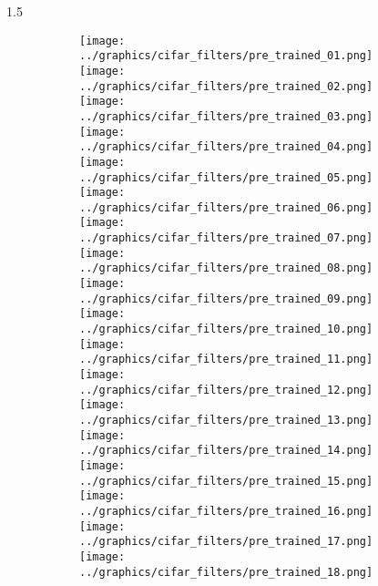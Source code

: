 \documentclass[final]{beamer}
\newlength{\onecolwid}
\newlength{\threecolwid}
\begin{document}
\begin{frame}[t]
\begin{columns}[t]
\begin{column}{\threecolwid}
\begin{alertblock}
\begin{columns}[t]
\begin{column}{1.5\onecolwid}
\begin{figure}
				\begin{subfigure}{.4\linewidth}
					\centering
					\texttt{[image: ../graphics/cifar\_filters/pre\_trained\_01.png]} 
					\texttt{[image: ../graphics/cifar\_filters/pre\_trained\_02.png]} %
					\texttt{[image: ../graphics/cifar\_filters/pre\_trained\_03.png]}
					\texttt{[image: ../graphics/cifar\_filters/pre\_trained\_04.png]} %
					\texttt{[image: ../graphics/cifar\_filters/pre\_trained\_05.png]} %
					\texttt{[image: ../graphics/cifar\_filters/pre\_trained\_06.png]} \\
					\texttt{[image: ../graphics/cifar\_filters/pre\_trained\_07.png]} %
					\texttt{[image: ../graphics/cifar\_filters/pre\_trained\_08.png]} %
					\texttt{[image: ../graphics/cifar\_filters/pre\_trained\_09.png]}
					\texttt{[image: ../graphics/cifar\_filters/pre\_trained\_10.png]} 
					\texttt{[image: ../graphics/cifar\_filters/pre\_trained\_11.png]} %
					\texttt{[image: ../graphics/cifar\_filters/pre\_trained\_12.png]} \\
					\texttt{[image: ../graphics/cifar\_filters/pre\_trained\_13.png]} %
					\texttt{[image: ../graphics/cifar\_filters/pre\_trained\_14.png]} %
					\texttt{[image: ../graphics/cifar\_filters/pre\_trained\_15.png]}
					\texttt{[image: ../graphics/cifar\_filters/pre\_trained\_16.png]} %
					\texttt{[image: ../graphics/cifar\_filters/pre\_trained\_17.png]} %
					\texttt{[image: ../graphics/cifar\_filters/pre\_trained\_18.png]}
				\end{subfigure}
				\begin{subfigure}{.4\linewidth}

\end{subfigure}
\end{figure}
\end{column}
\end{columns}
\end{alertblock}
\end{column}
\end{columns}
\end{frame}
\end{document}
